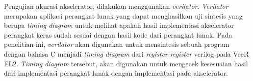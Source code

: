 Pengujian akurasi akselerator, dilakukan menggunakan \textit{verilator}. \textit{Verilator} \parencite{verilator2024github} merupakan aplikasi perangkat lunak yang dapat menghasilkan uji sintesis yang berupa \textit{timing diagram} untuk melihat apakah hasil implementasi akselerator perangkat keras sudah sesuai dengan hasil kode dari perangkat lunak. Pada penelitian ini, \textit{verilator} akan digunakan untuk mensintesis sebuah program dengan bahasa C menjadi \textit{timing diagram} dari \textit{register-register} verilog pada VeeR EL2. \textit{Timing diagram} tersebut, akan digunakan untuk mengecek kesesuaian hasil dari implementasi perangkat lunak dengan implementasi pada akselerator.
